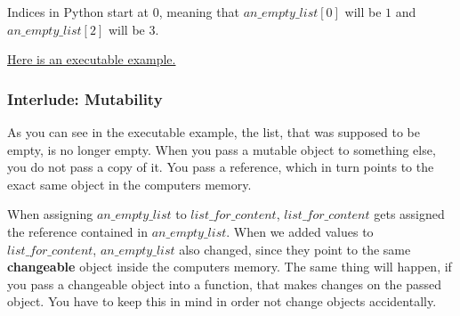 \documentclass{article}
\begin{document}
Indices in Python start at 0, meaning that
$an\_empty\_list[0]$ will be $1$ and $an\_empty\_list[2]$
will be 3.

\href{http://pythontutor.com/visualize.html\#code=an\_empty\_list\%20\%3D\%20list\%28\%29\%0Aanother\_empty\_list\%20\%3D\%20\%5B\%5D\%0A\%0Alist\_for\_content\%20\%3D\%20an\_empty\_list\%0Alist\_for\_content.append\%281\%29\%0A\%23\%20The\%20name\%20of\%20an\_empty\_list\%20is\%20now\%20a\%20lie.\%0Alist\_for\_content.append\%282\%29\%0Alist\_for\_content.append\%283\%29\%0A\%0Aa\_list\_with\_content\%20\%3D\%20\%5B1\%20,2\%20,3\%5D\%0A\%0Aprint\%28an\_empty\_list\%29\%0Aprint\%28another\_empty\_list\%29\%0Aprint\%28list\_for\_content\%29\%0Aprint\%28a\_list\_with\_content\%29\%0A\%0Aprint\%28an\_empty\_list\%5B0\%5D\%29\%0Aprint\%28an\_empty\_list\%5B2\%5D\%29\&cumulative=false\&curInstr=13\&heapPrimitives=nevernest\&mode=display\&origin=opt-frontend.js\&py=3\&rawInputLstJSON=\%5B\%5D\&textReferences=false }
{Here is an executable example.}


\subsubsection{Interlude: Mutability}

As you can see in the executable example, the list, that was supposed to be empty, is no longer empty.
When you pass a mutable object to something else, you do not pass a copy of it.
You pass a reference, which in turn points to the exact same object in the computers memory.

When assigning $an\_empty\_list$ to $list\_for\_content$, $list\_for\_content$ gets assigned
the reference contained in $an\_empty\_list$.
When we added values to $list\_for\_content$, $an\_empty\_list$ also changed, since they
point to the same \textbf{changeable} object inside the computers memory.
The same thing will happen, if you pass a changeable object into a function, that
makes changes on the passed object.
You have to keep this in mind in order not change objects accidentally.
\end{document}
